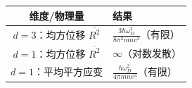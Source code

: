 \begin{formulabox}[答案汇总]
\begin{center}
\begin{tabular}{cl}
\toprule
维度/物理量 & 结果 \\
\midrule
$d=3$：均方位移 $\overline{R^2}$ & $\displaystyle \frac{3\hbar\omega_D^2}{8\pi^2 mnv^3}$（有限） \\[10pt]
$d=1$：均方位移 $\overline{R^2}$ & $\displaystyle \infty$（对数发散） \\[10pt]
$d=1$：平均平方应变 & $\displaystyle \frac{\hbar\omega_D^2}{4\pi mnv^3}$（有限） \\
\bottomrule
\end{tabular}
\end{center}
\end{formulabox}

